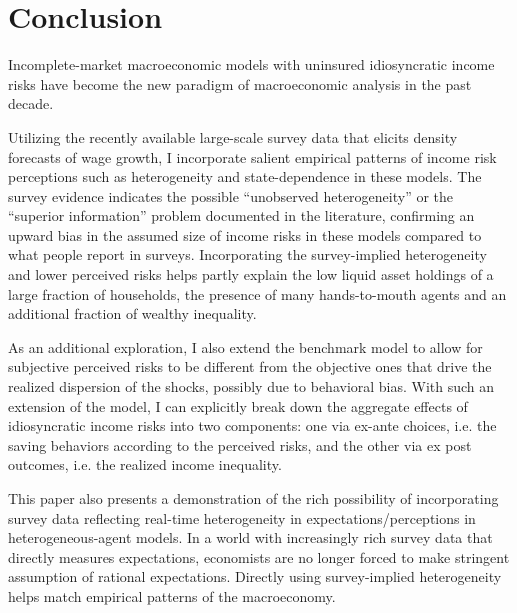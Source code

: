 \hypertarget{conclusion}{%
\section{Conclusion}\label{conclusion}}

Incomplete-market macroeconomic models with uninsured idiosyncratic income risks have become the new paradigm of macroeconomic analysis in the past decade. 


Utilizing the recently available large-scale survey data that elicits density forecasts of wage growth, I incorporate salient empirical patterns of income risk perceptions such as heterogeneity and state-dependence in these models. The survey evidence indicates the possible ``unobserved heterogeneity'' or the ``superior information'' problem documented in the literature, confirming an upward bias in the assumed size of income risks in these models compared to what people report in surveys. Incorporating the survey-implied heterogeneity and lower perceived risks helps partly explain the low liquid asset holdings of a large fraction of households, the presence of many hands-to-mouth agents and an additional fraction of wealthy inequality. 

As an additional exploration, I also extend the benchmark model to allow for subjective perceived risks to be different from the objective ones that drive the realized dispersion of the shocks, possibly due to behavioral bias. With such an extension of the model, I can explicitly break down the aggregate effects of idiosyncratic income risks into two components: one via ex-ante choices, i.e. the saving behaviors according to the perceived risks, and the other via ex post outcomes, i.e. the realized income inequality.  

This paper also presents a demonstration of the rich possibility of incorporating survey data reflecting real-time heterogeneity in expectations/perceptions in heterogeneous-agent models. In a world with increasingly rich survey data that directly measures expectations, economists are no longer forced to make stringent  assumption of rational expectations. Directly using survey-implied heterogeneity helps match empirical patterns of the macroeconomy. 

